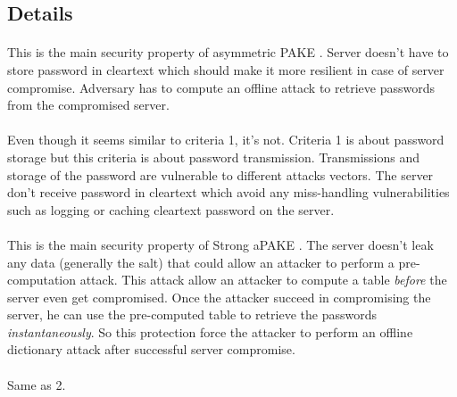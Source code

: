 \documentclass[../report.tex]{subfiles}
\begin{document}
\subsection{Details} \label{sec:comparison_details}



\paragraph{}
This is the main security property of asymmetric PAKE \cite{aPAKE_Formalized}. Server doesn't have to store password in cleartext which should make it more resilient in case of server compromise. Adversary has to compute an offline attack to retrieve passwords from the compromised server.

\paragraph{}
Even though it seems similar to criteria 1, it's not. Criteria 1 is about password storage but this criteria is about password transmission. Transmissions and storage of the password are vulnerable to different attacks vectors.
The server don't receive password in cleartext which avoid any miss-handling vulnerabilities such as logging or caching cleartext password on the server.

\paragraph{}
This is the main security property of Strong aPAKE \cite{OPAQUE_Paper}. The server doesn't leak any data (generally the salt) that could allow an attacker to perform a pre-computation attack. This attack allow an attacker to compute a table \emph{before} the server even get compromised. Once the attacker succeed in compromising the server, he can use the pre-computed table to retrieve the passwords \emph{instantaneously}. So this protection force the attacker to perform an offline dictionary attack after successful server compromise. %

\paragraph{}
Same as 2.
\end{document}
